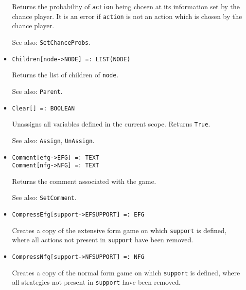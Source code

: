 \begin{itemize}
\bd
Returns the probability of \verb+action+ being chosen at its information
set by the chance player.  It is an error if \verb+action+ is not an action
which is chosen by the chance player.
\item [See also:] \verb+SetChanceProbs+.
\ed

\item{}
\protect \large \begin{verbatim} 
Children[node->NODE] =: LIST(NODE) 
\end{verbatim}\normalsize

\bd
Returns the list of children of \verb+node+.
\item [See also:] \verb+Parent+.
\ed

\item{}
\protect \large \begin{verbatim}
Clear[] =: BOOLEAN 
\end{verbatim}\normalsize

\bd
Unassigns all variables defined in the current scope.  Returns \verb+True+.
\item [See also:] \verb+Assign+, \verb+UnAssign+.
\ed

\item{}
\protect \large \begin{verbatim}
Comment[efg->EFG] =: TEXT
Comment[nfg->NFG] =: TEXT
\end{verbatim}\normalsize

\bd
Returns the comment associated with the game.
\item [See also:] \verb+SetComment+.
\ed

\item{}
\protect \large \begin{verbatim}
CompressEfg[support->EFSUPPORT] =: EFG 
\end{verbatim}\normalsize

\bd
Creates a copy of the extensive form game on which \verb+support+ is
defined, where all actions not present in \verb+support+ have been
removed.
\ed

\item{}
\protect \large \begin{verbatim}
CompressNfg[support->NFSUPPORT] =: NFG 
\end{verbatim}\normalsize

\bd
Creates a copy of the normal form game on which \verb+support+ is
defined, where all strategies not present in \verb+support+ have been
removed.
\ed


\end{itemize}
